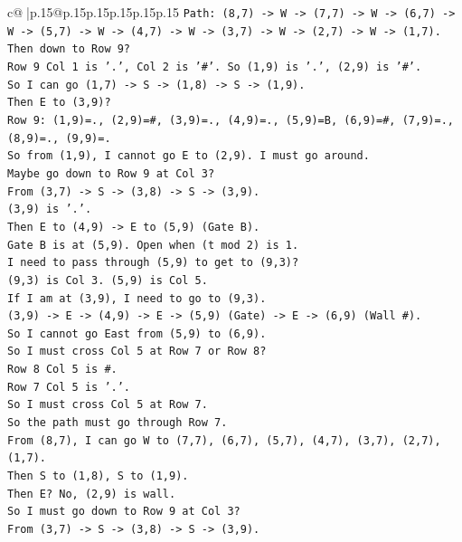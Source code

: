 \documentclass{article}
\begin{document}
{\begin{supertabular}{c@{$\;$}|p{.15\linewidth}@{}p{.15\linewidth}p{.15\linewidth}p{.15\linewidth}p{.15\linewidth}p{.15\linewidth}}
{{{\texttt{Path: (8,7) {-}> W {-}> (7,7) {-}> W {-}> (6,7) {-}> W {-}> (5,7) {-}> W {-}> (4,7) {-}> W {-}> (3,7) {-}> W {-}> (2,7) {-}> W {-}> (1,7).} \\
\texttt{Then down to Row 9?} \\
\texttt{Row 9 Col 1 is '.', Col 2 is '\#'. So (1,9) is '.', (2,9) is '\#'.} \\
\texttt{So I can go (1,7) {-}> S {-}> (1,8) {-}> S {-}> (1,9).} \\
\texttt{Then E to (3,9)?} \\
\texttt{Row 9: (1,9)=., (2,9)=\#, (3,9)=., (4,9)=., (5,9)=B, (6,9)=\#, (7,9)=., (8,9)=., (9,9)=.} \\
\texttt{So from (1,9), I cannot go E to (2,9). I must go around.} \\
\texttt{Maybe go down to Row 9 at Col 3?} \\
\texttt{From (3,7) {-}> S {-}> (3,8) {-}> S {-}> (3,9).} \\
\texttt{(3,9) is '.'.} \\
\texttt{Then E to (4,9) {-}> E to (5,9) (Gate B).} \\
\texttt{Gate B is at (5,9). Open when (t mod 2) is 1.} \\
\texttt{I need to pass through (5,9) to get to (9,3)?} \\
\texttt{(9,3) is Col 3. (5,9) is Col 5.} \\
\texttt{If I am at (3,9), I need to go to (9,3).} \\
\texttt{(3,9) {-}> E {-}> (4,9) {-}> E {-}> (5,9) (Gate) {-}> E {-}> (6,9) (Wall \#).} \\
\texttt{So I cannot go East from (5,9) to (6,9).} \\
\texttt{So I must cross Col 5 at Row 7 or Row 8?} \\
\texttt{Row 8 Col 5 is \#.} \\
\texttt{Row 7 Col 5 is '.'.} \\
\texttt{So I must cross Col 5 at Row 7.} \\
\texttt{So the path must go through Row 7.} \\
\texttt{From (8,7), I can go W to (7,7), (6,7), (5,7), (4,7), (3,7), (2,7), (1,7).} \\
\texttt{Then S to (1,8), S to (1,9).} \\
\texttt{Then E? No, (2,9) is wall.} \\
\texttt{So I must go down to Row 9 at Col 3?} \\
\texttt{From (3,7) {-}> S {-}> (3,8) {-}> S {-}> (3,9).} \\
}}}
\end{supertabular}}
\end{document}
